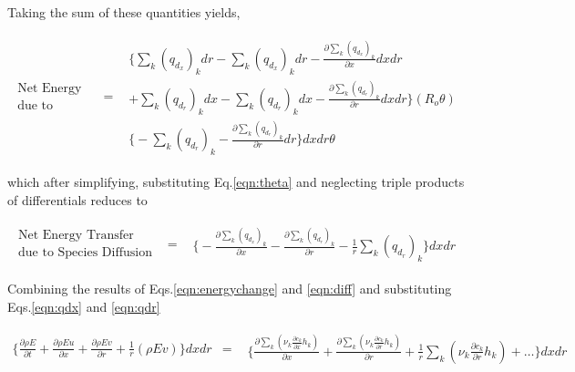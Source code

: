 	Taking the sum of these quantities yields,

\begin{displaymath}
	\begin{array}{ccc}
		\begin{array}{c}
		\textrm{Net Energy Transfer} \\ \textrm{due to Species Diffusion}
		\end{array} & = &
			\begin{array}{c}
		\Big\{\sum_k (q_{d_x})_kdr - \sum_k (q_{d_x})_kdr - \frac{\partial \sum_k (q_{d_x})_k}{\partial x}dxdr \\
		+  \sum_k (q_{d_r})_kdx - \sum_k (q_{d_r})_kdx - \frac{\partial \sum _k(q_{d_r})_k}{\partial r}dxdr\Big\}
		(R_o \theta)\\
		\Big\{-\sum_k (q_{d_r})_k - \frac{\partial \sum_k (q_{d_r})_k}{\partial r}dr\Big\}dxdr \theta
			\end{array}
	\end{array}
\end{displaymath}

	which after simplifying, substituting Eq.\ref{eqn:theta} and neglecting triple products of differentials reduces to

\begin{equation}
	\begin{array}{ccc}
	\begin{array}{c}
	\textrm{Net Energy Transfer} \\ \textrm{due to Species Diffusion}
	\end{array} & = &
		\begin{array}{c}
			\Big\{-\frac{\partial \sum_k (q_{d_x})_k}{\partial x} - \frac{\partial \sum_k (q_{d_r})_k}{\partial r}
			- \frac{1}{r} \sum_k (q_{d_r})_k \Big\}dxdr	
		\end{array}
	\end{array}
\label{eqn:diff}
\end{equation}

	Combining the results of Eqs.\ref{eqn:energychange} and \ref{eqn:diff} and substituting Eqs.\ref{eqn:qdx} and
\ref{eqn:qdr}

\begin{displaymath}
	\begin{array}{ccc}
		\Big\{\frac{\partial \rho E}{\partial t} +\frac{\partial \rho E u}{\partial x} + \frac{\partial \rho E v}
		{\partial r} + \frac{1}{r}(\rho E v)\Big\}dxdr & = &
		\begin{array}{c}
			\Big\{\frac{\partial \sum_k (\nu_k \frac{\partial c_k}{\partial x}h_k)}{\partial x} 
			+ \frac{\partial \sum_k (\nu_k \frac{\partial c_k}{\partial r}h_k)}{\partial r}
			+ \frac{1}{r} \sum_k (\nu_k \frac{\partial c_k}{\partial r}h_k) + \ldots \Big\}dxdr	
		\end{array} 
	\end{array}
\end{displaymath}

